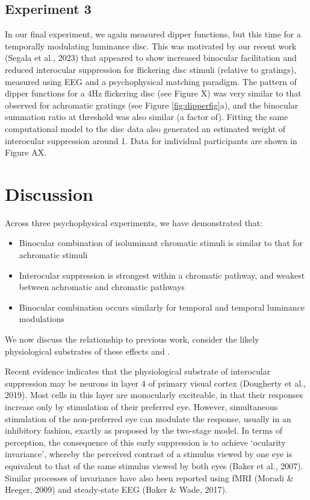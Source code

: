 \documentclass[
]{article}
\providecommand{\tightlist}{%
  \setlength{\itemsep}{0pt}\setlength{\parskip}{0pt}}
\begin{document}
\hypertarget{experiment-3}{%
\subsection{Experiment 3}\label{experiment-3}}

In our final experiment, we again measured dipper functions, but this time for a temporally modulating luminance disc. This was motivated by our recent work (Segala et al., 2023) that appeared to show increased binocular facilitation and reduced interocular suppression for flickering disc stimuli (relative to gratings), measured using EEG and a psychophysical matching paradigm. The pattern of dipper functions for a 4Hz flickering disc (see Figure X) was very similar to that observed for achromatic gratings (see Figure \ref{fig:dipperfig}a), and the binocular summation ratio at threshold was also similar (a factor of). Fitting the same computational model to the disc data also generated an estimated weight of interocular suppression around 1. Data for individual participants are shown in Figure AX.

\hypertarget{discussion}{%
\section{Discussion}\label{discussion}}

Across three psychophysical experiments, we have demonstrated that:

\begin{itemize}
\tightlist
\item
  Binocular combination of isoluminant chromatic stimuli is similar to that for achromatic stimuli
\item
  Interocular suppression is strongest within a chromatic pathway, and weakest between achromatic and chromatic pathways
\item
  Binocular combination occurs similarly for temporal and temporal luminance modulations
\end{itemize}

We now discuss the relationship to previous work, consider the likely physiological substrates of these effects and .

Recent evidence indicates that the physiological substrate of interocular suppression may be neurons in layer 4 of primary visual cortex (Dougherty et al., 2019). Most cells in this layer are monocularly exciteable, in that their responses increase only by stimulation of their preferred eye. However, simultaneous stimulation of the non-preferred eye can modulate the response, usually in an inhibitory fashion, exactly as proposed by the two-stage model. In terms of perception, the consequence of this early suppression is to achieve `ocularity invariance', whereby the perceived contrast of a stimulus viewed by one eye is equivalent to that of the same stimulus viewed by both eyes (Baker et al., 2007). Similar processes of invariance have also been reported using fMRI (Moradi \& Heeger, 2009) and steady-state EEG (Baker \& Wade, 2017).
\end{document}
